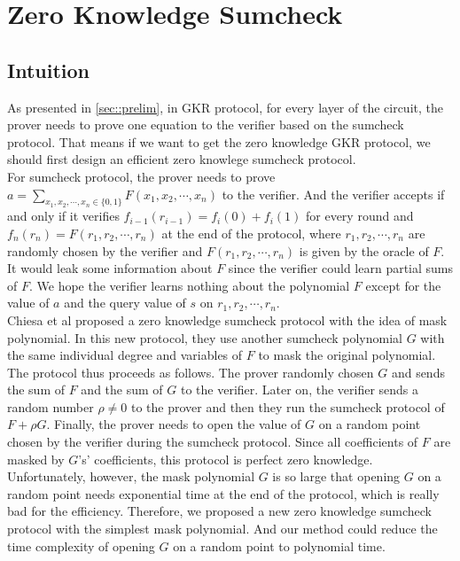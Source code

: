 

\section{Zero Knowledge Sumcheck}\label{ZKSumcheck}
\subsection{Intuition}
As presented in \ref{sec::prelim}, in GKR protocol\cite{GKR}, for every layer of the circuit, the prover needs to prove one equation to the verifier based on the sumcheck protocol. That means if we want to get the zero knowledge GKR protocol, we should first design an efficient zero knowlege sumcheck protocol.\\

For sumcheck protocol, the prover needs to prove $a = \sum\limits_{x_1, x_2, \cdots, x_n \in \{0, 1\}}F(x_1, x_2, \cdots, x_n)$ to the verifier. And the verifier accepts if and only if it verifies $f_{i-1}(r_{i-1}) = f_i(0) + f_i(1)$ for every round and $f_n(r_n) = F(r_1, r_2, \cdots, r_n)$ at the end of the protocol, where $r_1, r_2, \cdots, r_n$ are randomly chosen by the verifier and $F(r_1, r_2, \cdots, r_n)$ is given by the oracle of $F$. It would leak some information about $F$ since the verifier could learn partial sums of $F$. We hope the verifier learns nothing about the polynomial $F$ except for the value of $a$ and the query value of $s$ on $r_1, r_2, \cdots, r_n$.\\

Chiesa et al\cite{zksumcheck} proposed a zero knowledge sumcheck protocol with the idea of mask polynomial. In this new protocol, they use another sumcheck polynomial $G$ with the same individual degree and variables of $F$ to mask the original polynomial. The protocol thus proceeds as follows. The prover randomly chosen $G$ and sends the sum of $F$ and the sum of $G$ to the verifier. Later on, the verifier sends a random number $\rho \neq 0$ to the prover and then they run the sumcheck protocol of $F + \rho G$. Finally, the prover needs to open the value of $G$ on a random point chosen by the verifier during the sumcheck protocol. Since all coefficients of $F$ are masked by $G$'s' coefficients, this protocol is perfect zero knowledge.\\

Unfortunately, however, the mask polynomial $G$ is so large that opening $G$ on a random point needs exponential time at the end of the protocol, which is really bad for the efficiency. Therefore, we proposed a new zero knowledge sumcheck protocol with the simplest mask polynomial. And our method could reduce the time complexity of opening $G$ on a random point to polynomial time.\\

